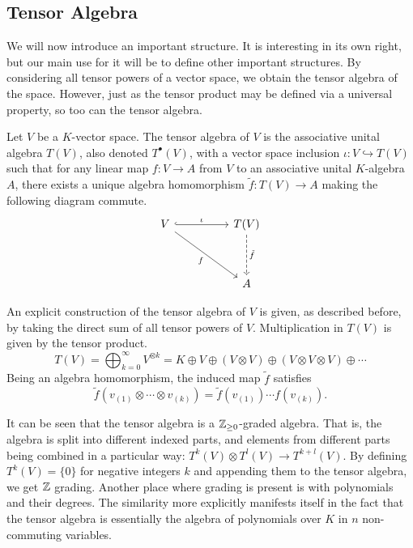 \documentclass[a4paper,12pt]{article}
\begin{document}
\subsection{Tensor Algebra}\label{subsec:multilinear_algebra:tensor_algebra}

We will now introduce an important structure.
It is interesting in its own right, but our main use for it will be to define other important structures.
By considering all tensor powers of a vector space, we obtain the tensor algebra of the space.
However, just as the tensor product may be defined via a universal property, so too can the tensor algebra.
\begin{definition}\label{def:tensor_algebra}
    Let $V$ be a $K$-vector space.
    The tensor algebra of $V$ is the associative unital algebra $T(V)$, also denoted $T^\bullet(V)$, with a vector space inclusion $\iota : V \hookrightarrow T(V)$ such that for any linear map $f \colon V \to A$ from $V$ to an associative unital $K$-algebra $A$, there exists a unique algebra homomorphism $\tilde{f} \colon T(V) \to A$ making the following diagram commute.
    \[\begin{tikzcd}
        {V} && {T(V)} \\
        \\
        && {A}
        \arrow["\iota", hook, from=1-1, to=1-3]
        \arrow["f"', from=1-1, to=3-3]
        \arrow["\tilde{f}", dashed, from=1-3, to=3-3]
    \end{tikzcd}\]
\end{definition}
\begin{remark}
    An explicit construction of the tensor algebra of $V$ is given, as described before, by taking the direct sum of all tensor powers of $V$.
    Multiplication in $T(V)$ is given by the tensor product.
    \begin{equation}
        T(V) = \bigoplus_{k=0}^\infty V^{\otimes k} = K \oplus V \oplus (V \otimes V) \oplus (V \otimes V \otimes V) \oplus \cdots
    \end{equation}
    Being an algebra homomorphism, the induced map $\tilde{f}$ satisfies
    \begin{equation}
        \tilde{f}(v_{(1)} \otimes \cdots \otimes v_{(k)}) = \tilde{f}(v_{(1)}) \cdots f(v_{(k)}).
    \end{equation}
\end{remark}
It can be seen that the tensor algebra is a $\mathbb{Z}_{\geq 0}$-graded algebra.
That is, the algebra is split into different indexed parts, and elements from different parts being combined in a particular way: $T^k (V) \otimes T^l(V) \to T^{k+l}(V)$.
By defining $T^k(V) = \{0\}$ for negative integers $k$ and appending them to the tensor algebra, we get $\mathbb{Z}$ grading.
Another place where grading is present is with polynomials and their degrees.
The similarity more explicitly manifests itself in the fact that the tensor algebra is essentially the algebra of polynomials over $K$ in $n$ non-commuting variables.
\end{document}
